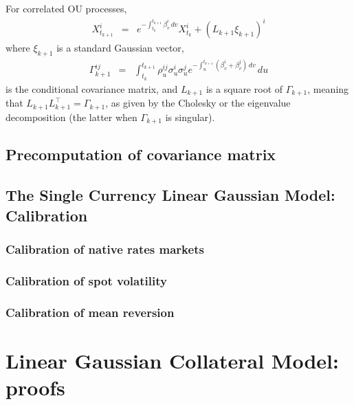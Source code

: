 \documentclass[11pt,english]{amsart}
\theoremstyle{definition}
\begin{document}
For correlated OU processes,
\begin{eqnarray*}
  X^i_{t_{k+1}}  &=&  e^{-\int_{t_k}^{t_{k+1}}\beta^i_v\,dv } X^i_{t_k} + (L_{k+1} \xi_{k+1})^i
\end{eqnarray*}
where $\xi_{k+1}$ is a standard Gaussian vector,
\begin{eqnarray*}
  \Gamma^{ij}_{k+1} 
   &=&  \int_{t_k}^{t_{k+1}} \rho^{ij}_u \sigma^i_u \sigma^j_u e^{-\int_{u}^{t_{k+1}}(\beta^i_v+\beta^j_v)\,dv } \, du 
\end{eqnarray*}
is the conditional covariance matrix, and $L_{k+1}$ is a square root of $\Gamma_{k+1}$, meaning that $L_{k+1}L_{k+1}^\top = \Gamma_{k+1}$, as given by the Cholesky or the eigenvalue decomposition (the latter when $\Gamma_{k+1}$ is singular).




\subsection{Precomputation of covariance matrix}





\subsection{The Single Currency Linear Gaussian Model: Calibration}



\subsubsection{Calibration of native rates markets}%


\subsubsection{Calibration of spot volatility}%



\subsubsection{Calibration of mean reversion}%





\newpage%
\section{Linear Gaussian Collateral Model: proofs}%
\end{document}
